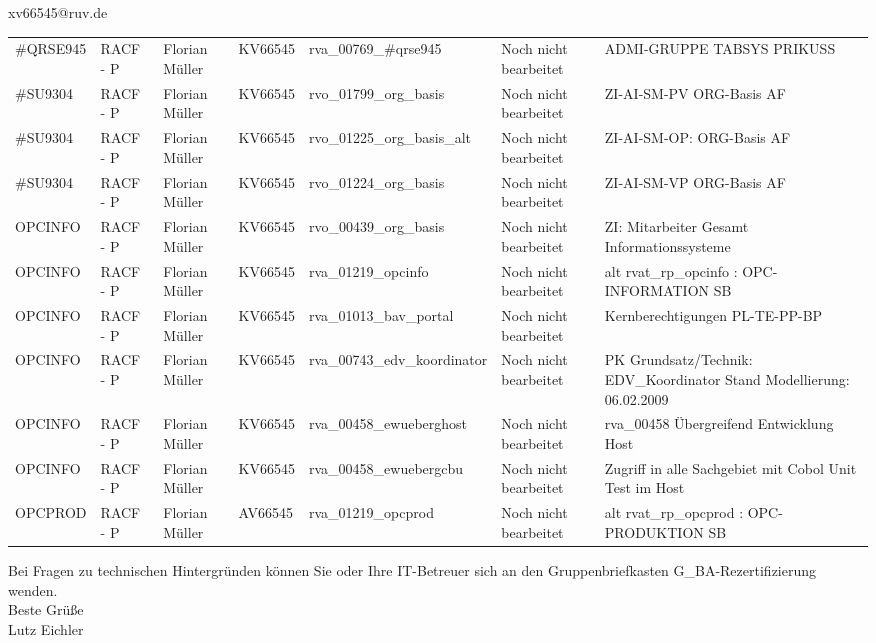 \documentclass[a4paper,landscape,12pt]{letter}
\begin{document}
\begin{letter}{xv66545@ruv.de\hfill \break}
\begin{tiny}
\begin{longtable}{|p{35mm}|p{15mm}|p{25mm}|p{10mm}|p{40mm}|p{50mm}|p{50mm}|}
\#QRSE945 & RACF - P & Florian Müller & KV66545 & rva\_00769\_\#qrse945 & Noch nicht bearbeitet & ADMI-GRUPPE TABSYS PRIKUSS \\
\#SU9304 & RACF - P & Florian Müller & KV66545 & rvo\_01799\_org\_basis & Noch nicht bearbeitet & ZI-AI-SM-PV ORG-Basis AF \\
\#SU9304 & RACF - P & Florian Müller & KV66545 & rvo\_01225\_org\_basis\_alt & Noch nicht bearbeitet & ZI-AI-SM-OP: ORG-Basis AF \\
\#SU9304 & RACF - P & Florian Müller & KV66545 & rvo\_01224\_org\_basis & Noch nicht bearbeitet & ZI-AI-SM-VP ORG-Basis AF \\
OPCINFO & RACF - P & Florian Müller & KV66545 & rvo\_00439\_org\_basis & Noch nicht bearbeitet & ZI: Mitarbeiter Gesamt Informationssysteme \\
OPCINFO & RACF - P & Florian Müller & KV66545 & rva\_01219\_opcinfo & Noch nicht bearbeitet & alt rvat\_rp\_opcinfo          : OPC- INFORMATION                         SB \\
OPCINFO & RACF - P & Florian Müller & KV66545 & rva\_01013\_bav\_portal & Noch nicht bearbeitet & Kernberechtigungen PL-TE-PP-BP \\
OPCINFO & RACF - P & Florian Müller & KV66545 & rva\_00743\_edv\_koordinator & Noch nicht bearbeitet & PK Grundsatz/Technik: EDV\_Koordinator Stand Modellierung: 06.02.2009 \\
OPCINFO & RACF - P & Florian Müller & KV66545 & rva\_00458\_ewueberghost & Noch nicht bearbeitet & rva\_00458 Übergreifend Entwicklung Host \\
OPCINFO & RACF - P & Florian Müller & KV66545 & rva\_00458\_ewuebergcbu & Noch nicht bearbeitet & Zugriff in alle Sachgebiet mit Cobol Unit Test im Host \\
OPCPROD & RACF - P & Florian Müller & AV66545 & rva\_01219\_opcprod & Noch nicht bearbeitet & alt rvat\_rp\_opcprod          : OPC-PRODUKTION                           SB \\

\hline
		\end{longtable}
		\end{tiny}
	
\begin{minipage}{\textwidth}
			Bei Fragen zu technischen Hintergründen können Sie 
			oder Ihre IT-Betreuer sich an den Gruppenbriefkasten 
			G\_BA-Rezertifizierung
			wenden.\\
			\linebreak
			Beste Grüße\\
			Lutz Eichler
	\end{minipage}
	\end{letter}
	
\end{document}
